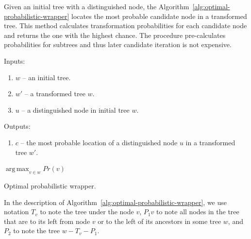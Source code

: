 Given an initial tree with a distinguished node, the Algorithm~\ref{alg:optimal-probabilistic-wrapper} locates the most probable candidate node in a transformed tree. This method calculates transformation probabilities for each candidate node and returns the one with the highest chance. The procedure pre-calculates probabilities for subtrees and thus later candidate iteration is not expensive.

Inputs: 

\begin{enumerate}
	\item $w$ -- an initial tree.
	\item $w'$ -- a transformed tree $w$.
	\item $u$ -- a distinguished node in initial tree $w$.
\end{enumerate}

Outputs: 

\begin{enumerate}
	\item $c$ -- the most probable location of a distinguished node $u$ in a transformed tree $w'$.
\end{enumerate}


\IncMargin{2em}
\begin{algorithm}

	\DontPrintSemicolon

	\BlankLine




	\Return $\operatorname*{arg\,max}_{v \in w} Pr(v)$ \;

	\caption{Optimal probabilistic wrapper.}
	\label{alg:optimal-probabilistic-wrapper}

\end{algorithm}
\DecMargin{2em}

In the description of Algorithm~\ref{alg:optimal-probabilistic-wrapper}, we use notation $T_v$ to note the tree under the node $v$, $P_1v$ to note all nodes in the tree that are to its left from node $v$ or to the left of its ancestors in some tree $w$, and $P_2$ to note the tree $w - T_v - P_1$.

